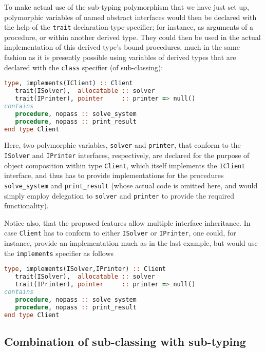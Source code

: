 \documentclass[11pt,oneside]{article}
\begin{document}
To make actual use of the sub-typing polymorphism that we have just
set up, polymorphic variables of named abstract interfaces would then
be declared with the help of the \texttt{trait}
declaration-type-specifier; for instance, as arguments of a procedure,
or within another derived type. They could then be used in the actual
implementation of this derived type's bound procedures, much in the
same fashion as it is presently possible using variables of derived
types that are declared with the \texttt{class} specifier (of
sub-classing):
\begin{lstlisting}[language=Fortran]
type, implements(IClient) :: Client
   trait(ISolver),  allocatable :: solver
   trait(IPrinter), pointer     :: printer => null()
contains
   procedure, nopass :: solve_system
   procedure, nopass :: print_result
end type Client
\end{lstlisting}
Here, two polymorphic variables, \texttt{solver} and \texttt{printer},
that conform to the \texttt{ISolver} and \texttt{IPrinter} interfaces,
respectively, are declared for the purpose of object composition
within type \texttt{Client}, which itself implements the
\texttt{IClient} interface, and thus has to provide implementations
for the procedures \texttt{solve\_system} and \texttt{print\_result}
(whose actual code is omitted here, and would simply employ delegation
to \texttt{solver} and \texttt{printer} to provide the required
functionality).

Notice also, that the proposed features allow multiple interface
inheritance. In case \texttt{Client} has to conform to either
\texttt{ISolver} or \texttt{IPrinter}, one could, for instance,
provide an implementation much as in the last example, but would use
the \texttt{implements} specifier as follows
\begin{lstlisting}[language=Fortran]
type, implements(ISolver,IPrinter) :: Client
   trait(ISolver),  allocatable :: solver
   trait(IPrinter), pointer     :: printer => null()
contains
   procedure, nopass :: solve_system
   procedure, nopass :: print_result
end type Client
\end{lstlisting}

\subsection{Combination of sub-classing with sub-typing}
\end{document}
